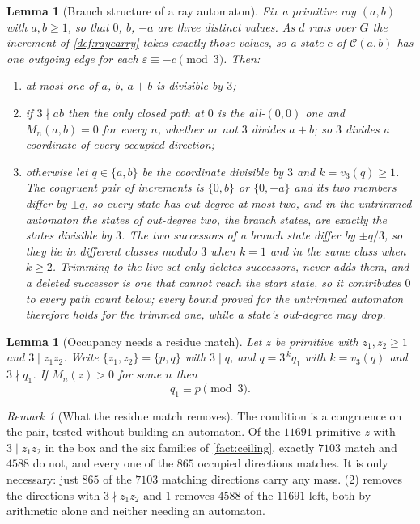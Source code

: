 \documentclass[11pt]{amsart}
\newtheorem{lemma}[theorem]{Lemma}
\theoremstyle{definition}
\theoremstyle{remark}
\newtheorem{remark}[theorem]{Remark}
\begin{document}
\begin{lemma}[Branch structure of a ray automaton]
\label{lem:branch}
Fix a primitive ray $(a,b)$ with $a,b\ge 1$, so that $0$, $b$, $-a$ are three distinct values. As $d$ runs over $G$ the increment of \cref{def:raycarry} takes exactly those values, so a state $c$ of $\mathcal{C}(a,b)$ has one outgoing edge for each $\varepsilon\equiv-c\pmod 3$. Then:
\begin{enumerate}
\item at most one of $a$, $b$, $a+b$ is divisible by $3$;
\item if $3\nmid ab$ then the only closed path at $0$ is the all-$(0,0)$ one and $M_n(a,b)=0$ for every $n$, whether or not $3$ divides $a+b$; so $3$ divides a coordinate of every occupied direction;
\item otherwise let $q\in\{a,b\}$ be the coordinate divisible by $3$ and $k=v_3(q)\ge 1$. The congruent pair of increments is $\{0,b\}$ or $\{0,-a\}$ and its two members differ by $\pm q$, so every state has out-degree at most two, and in the untrimmed automaton the states of out-degree two, the \emph{branch} states, are exactly the states divisible by $3$. The two successors of a branch state differ by $\pm q/3$, so they lie in different classes modulo $3$ when $k=1$ and in the same class when $k\ge 2$. Trimming to the live set only deletes successors, never adds them, and a deleted successor is one that cannot reach the start state, so it contributes $0$ to every path count below; every bound proved for the untrimmed automaton therefore holds for the trimmed one, while a state's out-degree may drop.
\end{enumerate}
\end{lemma}

\begin{lemma}[Occupancy needs a residue match]
\label{lem:occupancy}
Let $z$ be primitive with $z_1,z_2\ge 1$ and $3\mid z_1z_2$. Write $\{z_1,z_2\}=\{p,q\}$ with $3\mid q$, and $q=3^{\,k}q_1$ with $k=v_3(q)$ and $3\nmid q_1$. If $M_n(z)>0$ for some $n$ then
\[
q_1\equiv p\pmod 3 .
\]
\end{lemma}

\begin{remark}[What the residue match removes]
\label{rem:occupancy}
The condition is a congruence on the pair, tested without building an automaton. Of the $11691$ primitive $z$ with $3\mid z_1z_2$ in the box and the six families of \cref{fact:ceiling}, exactly $7103$ match and $4588$ do not, and every one of the $865$ occupied directions matches. It is only necessary: just $865$ of the $7103$ matching directions carry any mass. (2) removes the directions with $3\nmid z_1z_2$ and \cref{lem:occupancy} removes $4588$ of the $11691$ left, both by arithmetic alone and neither needing an automaton.
\end{remark}
\end{document}
